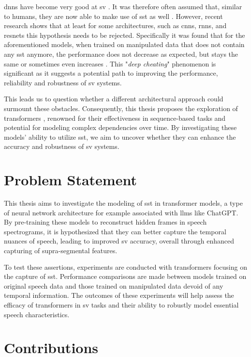 \Glspl{dnn} have become very good at \gls{sv} \cite{huh2023voxsrc}. It was therefore often assumed that, similar to humans, they are now able to make use of \gls{sst} as well \cites{stadelmann2018capturing, zhao2020improving, ye2021deep}. However, recent research shows that at least for some architectures, such as \glspl{cnn}, \glspl{rnn}, and \glspl{resnet} this hypothesis needs to be rejected. Specifically it was found that for the aforementioned models, when trained on manipulated data that does not contain any \gls{sst} anymore, the performance does not decrease as expected, but stays the same or sometimes even increases \cite{neururer2023deep}. This "\textit{deep cheating}" phenomenon is significant as it suggests a potential path to improving the performance, reliability and robustness of \gls{sv} systems.

This leads us to question whether a different architectural approach could surmount these obstacles. Consequently, this thesis proposes the exploration of transformers \cite{vaswani2017attention}, renowned for their effectiveness in sequence-based tasks and potential for modeling complex dependencies over time. By investigating these models' ability to utilize \gls{sst}, we aim to uncover whether they can enhance the accuracy and robustness of \gls{sv} systems.


\section{Problem Statement}

This thesis aims to investigate the modeling of \gls{sst} in transformer models, a type of neural network architecture for example associated with \glspl{llm} like ChatGPT. By pre-training these models to reconstruct hidden frames in speech spectrograms, it is hypothesized that they can better capture the temporal nuances of speech, leading to improved \gls{sv} accuracy, overall through enhanced capturing of supra-segmental features.

To test these assertions, experiments are conducted with transformers focusing on the capture of \gls{sst}. Performance comparisons are made between models trained on original speech data and those trained on manipulated data devoid of any temporal information. The outcomes of these experiments will help assess the efficacy of transformers in \gls{sv} tasks and their ability to robustly model essential speech characteristics.


\section{Contributions}

